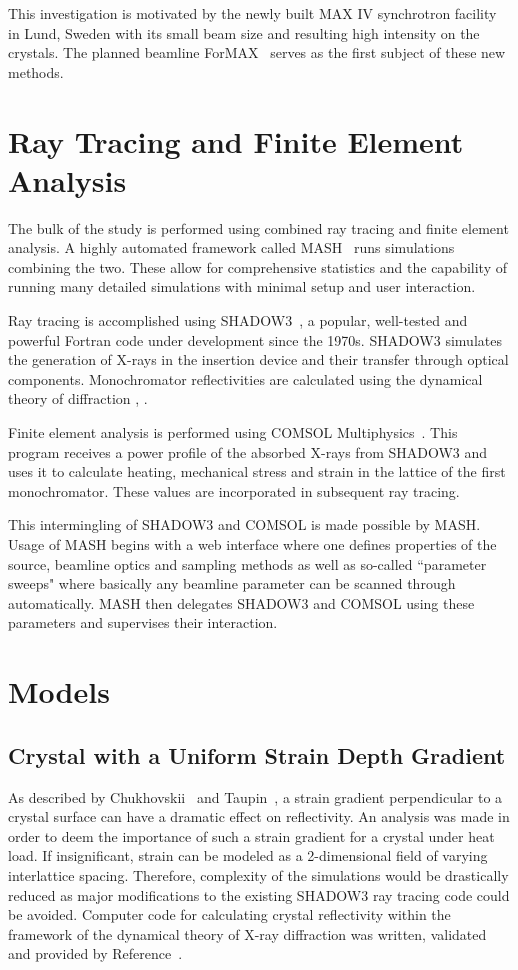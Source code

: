 \documentclass[preprint]{iucr}              %
\begin{document}
This investigation is motivated by the newly built MAX IV synchrotron facility in Lund, Sweden with its small beam size and resulting high intensity on the crystals. The planned beamline ForMAX~\cite{formax} serves as the first subject of these new methods.

\section{Ray Tracing and Finite Element Analysis}

The bulk of the study is performed using combined ray tracing and finite element analysis. A highly automated framework called MASH~\cite{mash} runs simulations combining the two. These allow for comprehensive statistics and the capability of running many detailed simulations with minimal setup and user interaction.

Ray tracing is accomplished using SHADOW3~\cite{shadow3}, a popular, well-tested and powerful Fortran code under development since the 1970s. SHADOW3 simulates the generation of X-rays in the insertion device and their transfer through optical components. Monochromator reflectivities are calculated using the dynamical theory of diffraction \cite{dynamicaltheory}, \cite{asymmetricdiffraction}.

Finite element analysis is performed using COMSOL Multiphysics~\cite{comsol}. This program receives a power profile of the absorbed X-rays from SHADOW3 and uses it to calculate heating, mechanical stress and strain in the lattice of the first monochromator. These values are incorporated in subsequent ray tracing.

This intermingling of SHADOW3 and COMSOL is made possible by MASH. Usage of MASH begins with a web interface where one defines properties of the source, beamline optics and sampling methods as well as so-called ``parameter sweeps" where basically any beamline parameter can be scanned through automatically. MASH then delegates SHADOW3 and COMSOL using these parameters and supervises their interaction.

\section{Models}

\subsection{Crystal with a Uniform Strain Depth Gradient}\label{strain_gradient} 
As described by Chukhovskii~\cite{Chukhovskii} and Taupin~\cite{Taupin}, a strain gradient perpendicular to a crystal surface can have a dramatic effect on reflectivity. An analysis was made in order to deem the importance of such a strain gradient for a crystal under heat load. If insignificant, strain can be modeled as a 2-dimensional field of varying interlattice spacing. Therefore, complexity of the simulations would be drastically reduced as major modifications to the existing SHADOW3 ray tracing code could be avoided. Computer code for calculating crystal reflectivity within the framework of the dynamical theory of X-ray diffraction was written, validated and provided by Reference~\cite{coins}.
\end{document}
